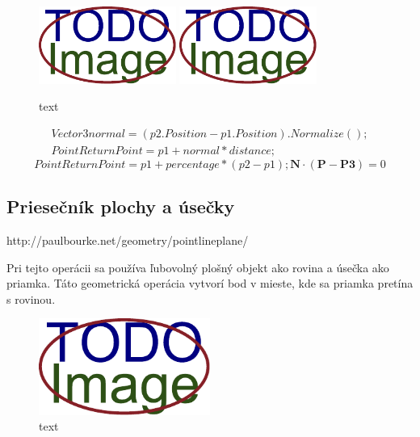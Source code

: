\begin{figure}[H]
	\centering
	\includegraphics[width=0.4\textwidth]{obrazky-figures/placeholder.pdf}
	\includegraphics[width=0.4\textwidth]{obrazky-figures/placeholder.pdf}
	\caption{text}
	\label{fig:1}
\end{figure}


\begin{equation}
\begin{split}
    Vector3 normal = (p2.Position - p1.Position).Normalize();
    \\
	Point ReturnPoint = p1 + normal * distance;
	\label{eq:LiearnInterpolationDist}
\end{split}
\end{equation}
\begin{equation}
    Point ReturnPoint = p1 + percentage * (p2 - p1);
    \textbf{N} \cdot (\textbf{P} - \textbf{P3}) = 0
	\label{eq:LiearnInterpolationPerc}
\end{equation}


\subsection{Priesečník plochy a úsečky}
http://paulbourke.net/geometry/pointlineplane/

Pri tejto operácii sa používa ľubovolný plošný objekt ako rovina a úsečka ako priamka. Táto geometrická operácia vytvorí bod v mieste, kde sa priamka pretína s rovinou. 
\begin{figure}[H]
	\centering
	\includegraphics[width=0.5\textwidth]{obrazky-figures/placeholder.pdf}
	\caption{text}
	\label{fig:GraphIntersection_Plane_Line}
\end{figure}


